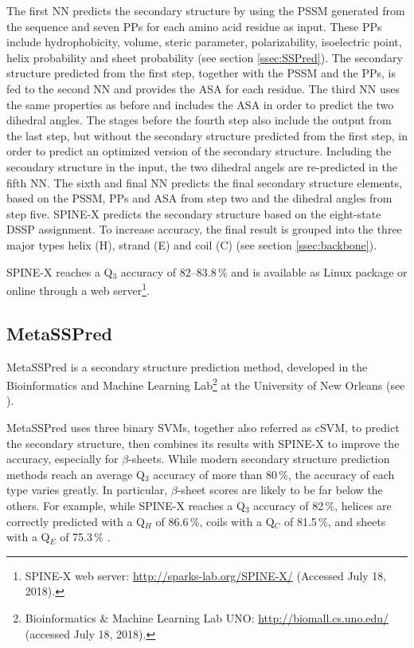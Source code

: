 The first \ac{NN} predicts the secondary structure by using the \ac{PSSM} generated  from the sequence and seven \acp{PP} for each amino acid residue as input. These \acp{PP} include hydrophobicity, volume, steric parameter, polarizability, isoelectric point, helix probability and sheet  probability (see section \ref{ssec:SSPred}).
The secondary structure predicted from the first step, together with the \ac{PSSM} and the \acp{PP}, is fed to the second \ac{NN} and provides the \ac{ASA} for each residue.
The third \ac{NN} uses the same properties as before and includes the \ac{ASA} in order to predict the two dihedral angles. 
The stages before the fourth step also include the output from the last step, but without the  secondary structure predicted from the first step, in order to predict an optimized version of the secondary structure.
Including the secondary structure in the input, the two dihedral angels are re-predicted in the fifth \ac{NN}. 
The sixth and final \ac{NN} predicts the final secondary structure elements, based on the \ac{PSSM}, \acp{PP} and \ac{ASA} from step two and the dihedral angles from step five.
SPINE-X predicts the secondary structure based on the eight-state \ac{DSSP} assignment. To increase accuracy, the final result is grouped into the three major types helix (H), strand (E) and coil (C) (see section \ref{ssec:backbone}).  

SPINE-X reaches a Q$_3$ accuracy of 82--83.8\,\% and is available as Linux package or online through a web server\footnote{SPINE-X web server: \url{http://sparks-lab.org/SPINE-X/} (Accessed July 18, 2018).}.


\subsection{MetaSSPred}
\label{sec:BSSP}

MetaSSPred is a secondary structure prediction method, developed in the Bioinformatics and Machine Learning Lab\footnote{Bioinformatics \& Machine Learning Lab UNO: \url{http://biomall.cs.uno.edu/} (accessed July 18, 2018).} at the University of New Orleans (see \cite{NasrulIslam.2016}). 

MetaSSPred uses three binary \acp{SVM}, together also referred as cSVM, to predict the secondary structure, then combines its results with SPINE-X to improve the accuracy, especially for $\beta$-sheets. 
While modern secondary structure prediction methods reach an average Q$_3$ accuracy of more than 80\,\%, the accuracy of each type varies greatly. In particular, $\beta$-sheet scores are likely to be far below the others. For example, while SPINE-X reaches a Q$_3$ accuracy of 82\,\%, helices are correctly predicted with a Q$_H$ of 86.6\,\%, coils with a Q$_C$ of 81.5\,\%, and sheets with a Q$_E$ of 75.3\,\% \cite{Faraggi.2012}.

